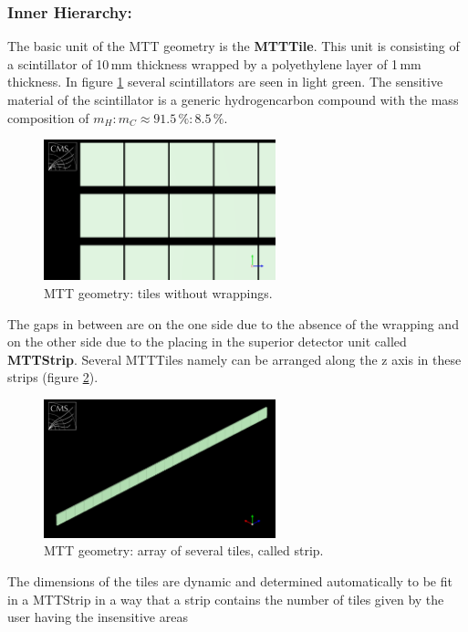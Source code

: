 			\subsubsection*{Inner Hierarchy:}
			The basic unit of the MTT geometry is the \textbf{MTTTile}.
			This unit is consisting of a scintillator of 10\,mm thickness wrapped by a polyethylene layer of 1\,mm thickness.
			In figure \ref{fig:tile_wowrapping} several scintillators are seen in light green.
			The sensitive material of the scintillator is a generic hydrogencarbon compound with the mass composition of $m_H:m_C \approx 91.5\,\%:8.5\,\%$.
			\begin{figure}[htbp]
				\centering
				\includegraphics[width=0.6\textwidth]{Figures/erdogan/tile_wowrapping.png}
				\caption{MTT geometry: tiles without wrappings.}
				\label{fig:tile_wowrapping}
			\end{figure}
			The gaps in between are on the one side due to the absence of the wrapping and on the other side due to the placing in the superior detector unit called \textbf{MTTStrip}.
			Several MTTTiles namely can be arranged along the z axis in these strips (figure \ref{fig:strip}).
			\begin{figure}[htbp]
				\centering
				\includegraphics[width=0.6\textwidth]{Figures/erdogan/strip.png}
				\caption{MTT geometry: array of several tiles, called strip.}
				\label{fig:strip}
			\end{figure}
			The dimensions of the tiles are dynamic and determined automatically to be fit in a MTTStrip in a way that a strip contains the number of tiles given by the user having the insensitive areas
